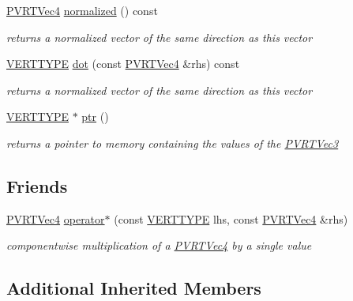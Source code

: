\begin{DoxyCompactItemize}
\hyperlink{struct_p_v_r_t_vec4}{P\+V\+R\+T\+Vec4} \hyperlink{struct_p_v_r_t_vec4_a8053f7ba7654b0fb2d934dd2624d7b8b}{normalized} () const 
\begin{DoxyCompactList}\small\item\em returns a normalized vector of the same direction as this vector \end{DoxyCompactList}\item 
\hyperlink{group___a_p_i___o_g_l_e_s_ga06da457b7d3e93368ab904f89e1396be}{V\+E\+R\+T\+T\+Y\+P\+E} \hyperlink{struct_p_v_r_t_vec4_a39c13afc68d06156b1c0ab2c8d29ef4a}{dot} (const \hyperlink{struct_p_v_r_t_vec4}{P\+V\+R\+T\+Vec4} \&rhs) const 
\begin{DoxyCompactList}\small\item\em returns a normalized vector of the same direction as this vector \end{DoxyCompactList}\item 
\hyperlink{group___a_p_i___o_g_l_e_s_ga06da457b7d3e93368ab904f89e1396be}{V\+E\+R\+T\+T\+Y\+P\+E} $\ast$ \hyperlink{struct_p_v_r_t_vec4_a4af280700e8195e6b4c2a2384624d926}{ptr} ()
\begin{DoxyCompactList}\small\item\em returns a pointer to memory containing the values of the \hyperlink{struct_p_v_r_t_vec3}{P\+V\+R\+T\+Vec3} \end{DoxyCompactList}\end{DoxyCompactItemize}
\subsection*{Friends}
\begin{DoxyCompactItemize}
\item 
\hyperlink{struct_p_v_r_t_vec4}{P\+V\+R\+T\+Vec4} \hyperlink{struct_p_v_r_t_vec4_aef5b4197c12cdab9e3e745e057994f4e}{operator$\ast$} (const \hyperlink{group___a_p_i___o_g_l_e_s_ga06da457b7d3e93368ab904f89e1396be}{V\+E\+R\+T\+T\+Y\+P\+E} lhs, const \hyperlink{struct_p_v_r_t_vec4}{P\+V\+R\+T\+Vec4} \&rhs)
\begin{DoxyCompactList}\small\item\em componentwise multiplication of a \hyperlink{struct_p_v_r_t_vec4}{P\+V\+R\+T\+Vec4} by a single value \end{DoxyCompactList}\end{DoxyCompactItemize}
\subsection*{Additional Inherited Members}


